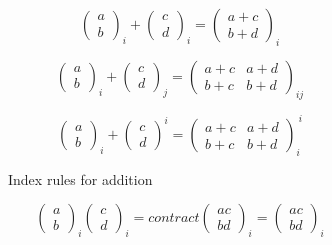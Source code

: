 \begin{figure}
\begin{minipage}[t]{0.5\columnwidth}
\begin{subfigure}[h]{1.0\textwidth}
\begin{center}
\[\begin{pmatrix}
a \\
b
\end{pmatrix}_{i}
+
\begin{pmatrix}
c \\
d
\end{pmatrix}_{i}
=
\begin{pmatrix}
a + c \\
b + d
\end{pmatrix}_{i}\]

\[\begin{pmatrix}
a \\
b
\end{pmatrix}_{i}
+
\begin{pmatrix}
c \\
d
\end{pmatrix}_{j}
=
\begin{pmatrix}
a + c & a + d \\
b + c & b + d
\end{pmatrix}_{ij}\]

\[\begin{pmatrix}
a \\
b
\end{pmatrix}_{i}
+
\begin{pmatrix}
c \\
d
\end{pmatrix}^{i}
=
\begin{pmatrix}
a + c & a + d \\
b + c & b + d
\end{pmatrix}_{i}^{\ i}\]
\end{center}
\caption{Index rules for addition}
\label{fig:ruleAdd}
\end{subfigure}
\end{minipage}%
\begin{minipage}[t]{0.5\columnwidth}
\begin{subfigure}[h]{1.0\textwidth}
\begin{center}
\[\begin{pmatrix}
a \\
b
\end{pmatrix}_{i}
\begin{pmatrix}
c \\
d
\end{pmatrix}_{i}
=
contract
\begin{pmatrix}
a c \\
b d
\end{pmatrix}_{i}
=
\begin{pmatrix}
a c \\
b d
\end{pmatrix}_{i}\]


\end{center}
\end{subfigure}
\end{minipage}
\end{figure}
